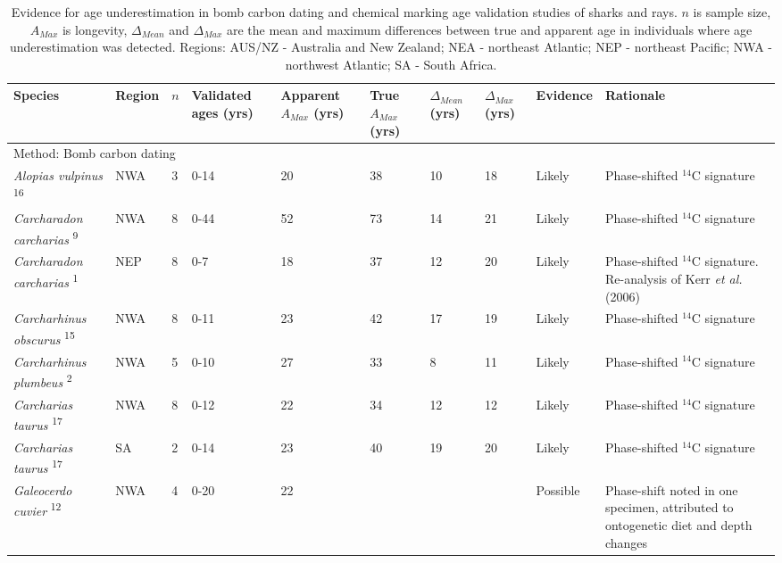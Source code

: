 \documentclass[]{article}
\begin{document}
\begin{landscape}
\begin{table}[ht]
\centering
\caption{Evidence for age underestimation in bomb carbon dating and chemical marking age validation studies of sharks and rays. $n$ is sample size, $A_{Max}$ is longevity, $\Delta_{Mean}$ and $\Delta_{Max}$ are the mean and maximum differences between true and apparent age in individuals where age underestimation was detected. Regions: AUS/NZ - Australia and New Zealand; NEA - northeast Atlantic; NEP - northeast Pacific; NWA - northwest Atlantic; SA - South Africa.\newline} 
\begin{tabular}{lllp{1.2cm}p{1.2cm}p{0.9cm}p{0.9cm}p{0.9cm}lp{8.5cm}}
  \toprule
Species & Region & $\textit{n}$ & Validated ages (yrs) & Apparent $A_{Max}$ (yrs) & True $A_{Max}$ (yrs) & $\Delta_{Mean}$ (yrs) & $\Delta_{Max}$ (yrs) & Evidence & Rationale \\ 
  \midrule
\multicolumn{10}{l}{Method: Bomb carbon dating}\\
\textit{Alopias vulpinus} \textsuperscript{16} & NWA &   3 & 0-14 &  20 &  38 &  10 &  18 & Likely & Phase-shifted $^{14}$C signature \\ 
  \textit{Carcharadon carcharias} \textsuperscript{9} & NWA &   8 & 0-44 &  52 &  73 &  14 &  21 & Likely & Phase-shifted $^{14}$C signature \\ 
  \textit{Carcharadon carcharias} \textsuperscript{1} & NEP &   8 & 0-7 &  18 &  37 &  12 &  20 & Likely & Phase-shifted $^{14}$C signature. Re-analysis of Kerr \textit{et al.} (2006) \\ 
  \textit{Carcharhinus obscurus} \textsuperscript{15} & NWA &   8 & 0-11 &  23 &  42 &  17 &  19 & Likely & Phase-shifted $^{14}$C signature \\ 
  \textit{Carcharhinus plumbeus} \textsuperscript{2} & NWA &   5 & 0-10 &  27 &  33 &   8 &  11 & Likely & Phase-shifted $^{14}$C signature \\ 
  \textit{Carcharias taurus} \textsuperscript{17} & NWA &   8 & 0-12 &  22 &  34 &  12 &  12 & Likely & Phase-shifted $^{14}$C signature \\ 
  \textit{Carcharias taurus} \textsuperscript{17} & SA &   2 & 0-14 &  23 &  40 &  19 &  20 & Likely & Phase-shifted $^{14}$C signature \\ 
  \textit{Galeocerdo cuvier} \textsuperscript{12} & NWA &   4 & 0-20 &  22 &  &  &  & Possible & Phase-shift noted in one specimen, attributed to ontogenetic diet and depth changes \\ 

\end{tabular}
\end{table}
\end{landscape}
\end{document}
